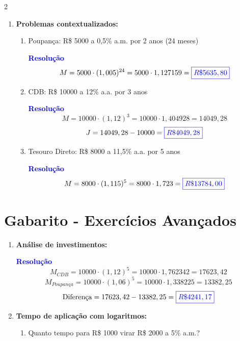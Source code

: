 \documentclass[11pt]{article}
\newcommand{\resposta}[1]{\textcolor{blue}{\boxed{#1}}}
\begin{document}
\begin{multicols}{2}
\begin{enumerate}[leftmargin=*, start=5]
\begin{enumerate}[label=\alph*)]
\item R\$ 1000 virar R\$ 2000 a 2\% a.m.

\textbf{\textcolor{blue}{Resolução}}
\[
2 = (1,02)^t \Rightarrow t = \frac{\ln 2}{\ln 1,02} = \frac{0,693147}{0,019803} \approx \resposta{35\ meses}
\]
\end{enumerate}

\item \textbf{Problemas contextualizados:}

\begin{enumerate}[label=\alph*)]
\item Poupança: R\$ 5000 a 0,5\% a.m. por 2 anos (24 meses)

\textbf{\textcolor{blue}{Resolução}}
\[
M = 5000 \cdot (1,005)^{24} = 5000 \cdot 1,127159 = \resposta{R\$ 5635,80}
\]

\item CDB: R\$ 10000 a 12\% a.a. por 3 anos

\textbf{\textcolor{blue}{Resolução}}
\[
M = 10000 \cdot (1,12)^3 = 10000 \cdot 1,404928 = 14049,28
\]
\[
J = 14049,28 - 10000 = \resposta{R\$ 4049,28}
\]

\item Tesouro Direto: R\$ 8000 a 11,5\% a.a. por 5 anos

\textbf{\textcolor{blue}{Resolução}}
\[
M = 8000 \cdot (1,115)^5 = 8000 \cdot 1,723 = \resposta{R\$ 13784,00}
\]
\end{enumerate}
\end{enumerate}

\section*{Gabarito - Exercícios Avançados}

\begin{enumerate}[leftmargin=*, start=9]

\item \textbf{Análise de investimentos:}

\textbf{\textcolor{blue}{Resolução}}
\[
M_{CDB} = 10000 \cdot (1,12)^5 = 10000 \cdot 1,762342 = 17623,42
\]
\[
M_{Poupança} = 10000 \cdot (1,06)^5 = 10000 \cdot 1,338225 = 13382,25
\]
\[
\text{Diferença} = 17623,42 - 13382,25 = \resposta{R\$ 4241,17}
\]

\item \textbf{Tempo de aplicação com logaritmos:}

\begin{enumerate}[label=\alph*)]
\item Quanto tempo para R\$ 1000 virar R\$ 2000 a 5\% a.m.?


\end{enumerate}
\end{enumerate}
\end{multicols}
\end{document}
